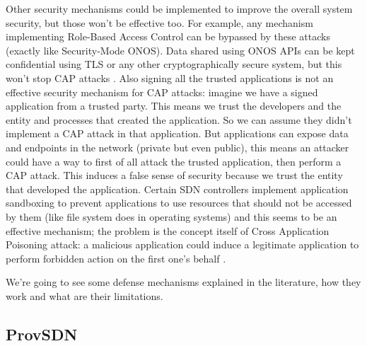 \documentclass[a4paper,10pt]{memoir}
\begin{document}
Other security mechanisms could be implemented to improve the overall system security, but those won't be effective too. For example, any mechanism implementing Role-Based Access Control can be bypassed by these attacks (exactly like Security-Mode ONOS). Data shared using ONOS APIs can be kept confidential using TLS or any other cryptographically secure system, but this won't stop CAP attacks \cite{tlsapis}. Also signing all the trusted applications is not an effective security mechanism for CAP attacks: imagine we have a signed application from a trusted party. This means we trust the developers and the entity and processes that created the application. So we can assume they didn't implement a CAP attack in that application. But applications can expose data and endpoints in the network (private but even public), this means an attacker could have a way to first of all attack the trusted application, then perform a CAP attack. This induces a false sense of security because we trust the entity that developed the application. Certain SDN controllers implement application sandboxing to prevent applications to use resources that should not be accessed by them (like file system does in operating systems) and this seems to be an effective mechanism; the problem is the concept itself of Cross Application Poisoning attack: a malicious application could induce a legitimate application to perform forbidden action on the first one's behalf \cite{rosemary}.

\medskip
We're going to see some defense mechanisms explained in the literature, how they work and what are their limitations.


\subsection{ProvSDN}
\end{document}

